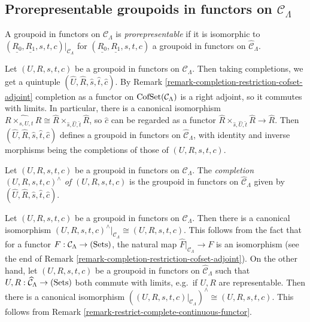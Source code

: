 \subsection{Prorepresentable groupoids in functors on $\mathcal C_{\Lambda}$}
\label{subsection-prerepresentable-groupoids-in-functors}

\begin{definition}
\label{definition-prorepresentable-groupoid-in-functors}
A groupoid in functors on $\mathcal C_{\Lambda}$ is {\it prorepresentable} if 
it is isomorphic to $(\underline{R_0}, \underline{R_1}, s,t,c)|_{\mathcal 
C_{\Lambda}}$ for $(\underline{R_0}, \underline{R_1}, s,t,c)$ a groupoid in 
functors on $\widehat{\mathcal C}_{\Lambda}$.
\end{definition}

\noindent
Let $(U,R,s,t,c)$ be a groupoid in functors on $\mathcal C_{\Lambda}$.  Then 
taking completions, we get a quintuple $(\widehat{U}, \widehat{R}, \widehat{s}, 
\widehat{t}, \widehat{c})$.  By Remark 
\ref{remark-completion-restriction-cofset-adjoint} completion as a functor on 
$\textnormal{CofSet}(\mathcal C_{\Lambda})$ is a right adjoint, so it commutes 
with limits.  In particular, there is a canonical isomorphism $\widehat{R 
\times_{s,U,t} R} \cong \widehat{R} \times_{\widehat{s}, \widehat{U}, 
\widehat{t}} \widehat{R}$, so $\widehat{c}$ can be regarded as a functor 
$\widehat{R} \times_{\widehat{s}, \widehat{U}, \widehat{t}} \widehat{R} 
\rightarrow \widehat{R}$.  Then $(\widehat{U}, \widehat{R}, \widehat{s}, 
\widehat{t}, \widehat{c})$ defines a groupoid in functors on $\widehat{\mathcal 
C}_{\Lambda}$, with identity and inverse morphisms being the completions of 
those of $(U,R,s,t,c)$.

\begin{definition}
\label{definition-completion-groupoud-in-functors}
Let $(U,R,s,t,c)$ be a groupoid in functors on $\mathcal C_{\Lambda}$.  The 
{\it completion $(U,R,s,t,c)^{\wedge}$ of $(U,R,s,t,c)$} is the groupoid in 
functors on $\widehat{\mathcal C}_{\Lambda}$ given by 
$(\widehat{U},\widehat{R},\widehat{s},\widehat{t},\widehat{c})$.
\end{definition}

\begin{remark}
\label{remark-groupoid-in-functors-complete-restrict}
Let $(U,R,s,t,c)$ be a groupoid in functors on $\mathcal C_{\Lambda}$. Then 
there is a canonical isomorphism $(U,R,s,t,c)^{\wedge}|_{\mathcal C_{\Lambda}} 
\cong (U,R,s,t,c)$.  This follows from the fact that for a functor $F: \mathcal 
C_{\Lambda} \rightarrow \textnormal{(Sets)}$, the natural map 
$\widehat{F}|_{\mathcal C_{\Lambda}} \rightarrow F$ is an isomorphism (see the 
end of Remark \ref{remark-completion-restriction-cofset-adjoint}).  On the 
other hand, let $(U,R,s,t,c)$ be a groupoid in functors on $\widehat{\mathcal 
C}_{\Lambda}$ such that $U, R: \widehat{\mathcal C}_{\Lambda} \rightarrow 
\textnormal{(Sets)}$ both commute with limits, e.g.\ if $U,R$ are 
representable. Then there is a canonical isomorphism $((U,R,s,t,c)|_{\mathcal 
C_{\Lambda}})^{\wedge} \cong (U,R,s,t,c)$. This follows from Remark 
\ref{remark-restrict-complete-continuous-functor}.
\end{remark}


